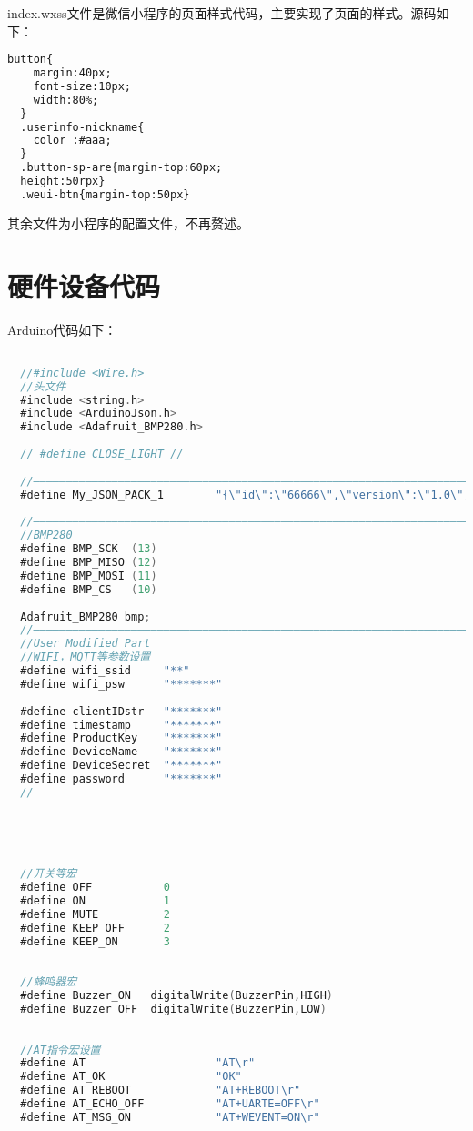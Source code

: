 \documentclass[12pt,hyperref,a4paper,UTF8]{ctexart}
\begin{document}
index.wxss文件是微信小程序的页面样式代码，主要实现了页面的样式。源码如下：
\begin{lstlisting}[language=html]
  button{
    margin:40px;
    font-size:10px;
    width:80%;
  }
  .userinfo-nickname{
    color :#aaa;
  }
  .button-sp-are{margin-top:60px;
  height:50rpx}
  .weui-btn{margin-top:50px}
\end{lstlisting}
其余文件为小程序的配置文件，不再赘述。

\section{硬件设备代码}
Arduino代码如下：
\begin{lstlisting}[language=C]

  //#include <Wire.h>
  //头文件
  #include <string.h>
  #include <ArduinoJson.h>
  #include <Adafruit_BMP280.h>
  
  // #define CLOSE_LIGHT //
  
  //————————————————————————————————————————————————————————————————————————
  #define My_JSON_PACK_1        "{\"id\":\"66666\",\"version\":\"1.0\",\"method\":\"thing.event.property.post\",\"params\":{\"Temperature\":%d.%02d,\"Photon\":%d}}\r"
  
  //————————————————————————————————————————————————————————————————————————
  //BMP280
  #define BMP_SCK  (13)
  #define BMP_MISO (12)
  #define BMP_MOSI (11)
  #define BMP_CS   (10)
  
  Adafruit_BMP280 bmp;
  //————————————————————————————————————————————————————————————————————————
  //User Modified Part
  //WIFI，MQTT等参数设置
  #define wifi_ssid     "**"    
  #define wifi_psw      "*******"     
  
  #define clientIDstr   "*******"
  #define timestamp     "*******"
  #define ProductKey    "*******"
  #define DeviceName    "*******"
  #define DeviceSecret  "*******"
  #define password      "*******"
  //————————————————————————————————————————————————————————————————————————
  
  
  
  
  
  //开关等宏
  #define OFF           0
  #define ON            1
  #define MUTE          2
  #define KEEP_OFF      2
  #define KEEP_ON       3
  
  
  //蜂鸣器宏
  #define Buzzer_ON   digitalWrite(BuzzerPin,HIGH)
  #define Buzzer_OFF  digitalWrite(BuzzerPin,LOW)
  
  
  //AT指令宏设置
  #define AT                    "AT\r"
  #define AT_OK                 "OK"
  #define AT_REBOOT             "AT+REBOOT\r"
  #define AT_ECHO_OFF           "AT+UARTE=OFF\r"
  #define AT_MSG_ON             "AT+WEVENT=ON\r"
  

\end{lstlisting}
\end{document}

